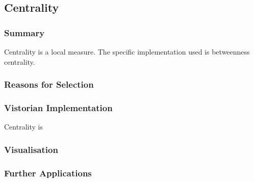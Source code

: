 \subsection{Centrality}
\subsubsection{Summary}
Centrality is a local measure. The specific implementation used is betweenness centrality. 

\subsubsection{Reasons for Selection}

\subsubsection{Vistorian Implementation}
Centrality is 

\subsubsection{Visualisation}
\subsubsection{Further Applications}

